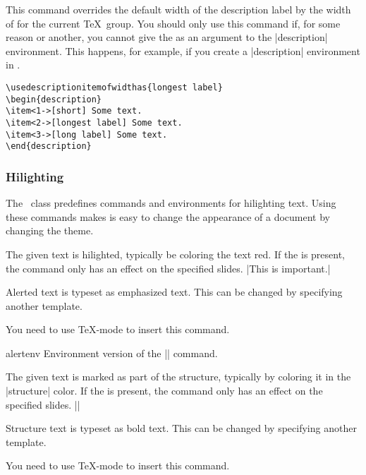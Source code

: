 \begin{command}{\usedescriptionitemofwidthas{}}
  This command overrides the default width of the
  description label by the width of  for the current
  \TeX\ group. You should only use this command if, for some reason or
  another, you cannot give the  as an argument to the
  |description| environment. This happens, for example, if you create a
  |description| environment in \LyX.

  \example
\begin{verbatim}
\usedescriptionitemofwidthas{longest label}
\begin{description}
\item<1->[short] Some text.
\item<2->[longest label] Some text.
\item<3->[long label] Some text.
\end{description}
\end{verbatim}
\end{command}



\subsubsection{Hilighting}

The \beamer\ class predefines commands and environments for
hilighting text. Using these commands makes is easy to change the
appearance of a document by changing the theme. 

\begin{command}{\alert{}}
  The given text is hilighted, typically be coloring the text red. If
  the  is present, the command only has an
  effect on the specified slides.
  \example |This is \alert{important}.|

  \articlenote
  Alerted text is typeset as emphasized text. This can be changed by
  specifying another template.

  \lyxnote
  You need to use \TeX-mode to insert this command.
\end{command}

\begin{environment}{{alertenv}}
  Environment version of the |\alert| command.
\end{environment}



\begin{command}{\structure{}}
  The given text is marked as part of the structure, typically by
  coloring it in the |structure| color. If the  is present, the command only has an effect on the
  specified slides.
  \example||

  \articlenote
  Structure text is typeset as bold text. This can be changed by
  specifying another template.

  \lyxnote
  You need to use \TeX-mode to insert this command.
\end{command}

